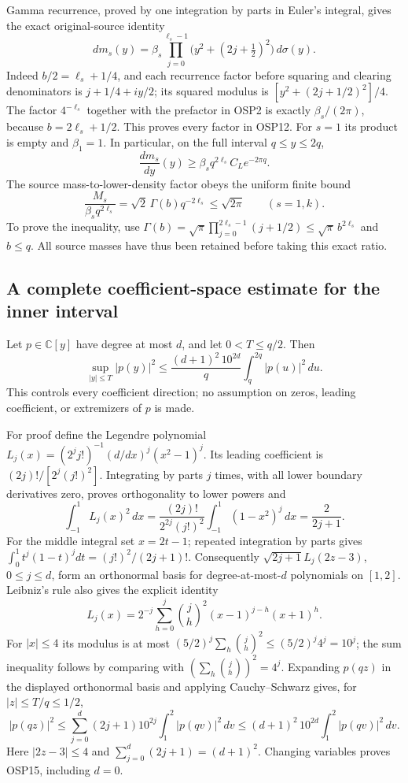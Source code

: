 \documentclass[11pt,a4paper]{article}
\begin{document}
Gamma recurrence, proved by one integration by parts in Euler's
integral, gives the exact original-source identity
\[
dm_s(y)=\beta_s
 \prod_{j=0}^{\ell_s-1}\bigl(y^2+(2j+\tfrac12)^2\bigr)\,d\sigma(y).
\tag{OSP12}
\]
Indeed $b/2=\ell_s+1/4$, and each recurrence factor before
squaring and clearing denominators is
$j+1/4+iy/2$; its squared modulus is
$[y^2+(2j+1/2)^2]/4$. The factor $4^{-\ell_s}$ together with
the prefactor in OSP2 is exactly $\beta_s/(2\pi)$, because
$b=2\ell_s+1/2$. This proves every factor in OSP12.
For $s=1$ its product is empty and $\beta_1=1$.
In particular, on the full interval $q\le y\le2q$,
\[
\frac{dm_s}{dy}(y)
 \ge \beta_s q^{2\ell_s}C_Le^{-2\pi q}.
\tag{OSP13}
\]
The source mass-to-lower-density factor obeys the uniform finite bound
\[
\frac{M_s}{\beta_s q^{2\ell_s}}
 =\sqrt2\,\Gamma(b)q^{-2\ell_s}
 \le\sqrt{2\pi}\qquad(s=1,k).
\tag{OSP14}
\]
To prove the inequality, use
$\Gamma(b)=\sqrt\pi\prod_{j=0}^{2\ell_s-1}(j+1/2)
\le\sqrt\pi\,b^{2\ell_s}$ and $b\le q$.
All source masses have thus been retained before taking this exact
ratio.

\subsection{A complete coefficient-space estimate for the inner interval}

Let $p\in\mathbb C[y]$ have degree at most $d$, and let
$0<T\le q/2$. Then
\[
\sup_{|y|\le T}|p(y)|^2
 \le \frac{(d+1)^2\,10^{2d}}q
                  \int_q^{2q}|p(u)|^2\,du.
\tag{OSP15}
\]
This controls every coefficient direction; no assumption on zeros,
leading coefficient, or extremizers of $p$ is made.

For proof define the Legendre polynomial
$L_j(x)=(2^j j!)^{-1}(d/dx)^j(x^2-1)^j$.
Its leading coefficient is $(2j)!/[2^j(j!)^2]$. Integrating by
parts $j$ times, with all lower boundary derivatives zero, proves
orthogonality to lower powers and
\[
\int_{-1}^1L_j(x)^2\,dx
=\frac{(2j)!}{2^{2j}(j!)^2}\int_{-1}^1(1-x^2)^j\,dx
=\frac2{2j+1}.
\]
For the middle integral set $x=2t-1$; repeated integration by parts
gives $\int_0^1t^j(1-t)^jdt=(j!)^2/(2j+1)!$.
Consequently $\sqrt{2j+1}L_j(2z-3)$, $0\le j\le d$,
form an orthonormal basis for degree-at-most-$d$ polynomials on
$[1,2]$. Leibniz's rule also gives the explicit identity
\[
L_j(x)=2^{-j}\sum_{h=0}^j\binom jh^2
                         (x-1)^{j-h}(x+1)^h.
\]
For $|x|\le4$ its modulus is at most
$(5/2)^j\sum_h\binom jh^2\le(5/2)^j4^j=10^j$;
the sum inequality follows by comparing with
$(\sum_h\binom jh)^2=4^j$.
Expanding $p(qz)$ in the displayed orthonormal basis and applying
Cauchy--Schwarz gives, for $|z|\le T/q\le1/2$,
\[
|p(qz)|^2
\le\sum_{j=0}^d(2j+1)10^{2j}
                  \int_1^2|p(qv)|^2\,dv
\le(d+1)^2\,10^{2d}\int_1^2|p(qv)|^2\,dv .
\]
Here $|2z-3|\le4$ and $\sum_{j=0}^d(2j+1)=(d+1)^2$.
Changing variables proves OSP15, including $d=0$.
\end{document}
